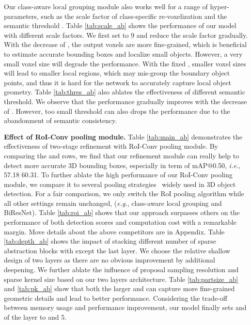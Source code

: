 \documentclass{article}
\begin{document}
Our class-aware local grouping module also works well for a range of hyper-parameters, such as the scale factor  of class-specific re-voxelization and the semantic threshold . Table \ref{tab:scale_ab} shows the performance of our model with different scale factors. We first set  to 9 and reduce the scale factor  gradually. With the decrease of , the output voxels are more fine-grained, which is beneficial to estimate accurate bounding boxes and localize small objects. However, a very small voxel size will degrade the performance. With the fixed , smaller voxel sizes will lead to smaller local regions, which may mis-group the boundary object points, and thus it is hard for the network to accurately capture local object geometry. Table \ref{tab:thres_ab} also ablates the effectiveness of different semantic threshold. We observe that the performance gradually improves with the decrease of . However, too small threshold can also drops the performance due to the abandonment of semantic consistency.

\textbf{Effect of RoI-Conv pooling module.} Table \ref{tab:main_ab} demonstrates the effectiveness of two-stage refinement with RoI-Conv pooling module. By comparing the  and  rows, we find that our refinement module can really help to detect more accurate 3D bounding boxes, especially in term of mAP@0.50, \textit{i.e.}, 57.18  60.31. To further ablate the high performance of our RoI-Conv pooling module, we compare it to several pooling strategies~\cite{shi2019pointrcnn,shi2020p2} widely used in 3D object detection. For a fair comparison, we only switch the RoI pooling algorithm while all other settings remain unchanged, (\textit{e.g.}, class-aware local grouping and BiResNet). Table \ref{tab:roi_ab} shows that our approach surpasses others on the performance of both detection scores and computation cost with a remarkable margin. Move details about the above competitors are in Appendix. Table \ref{tab:depth_ab} shows the impact of stacking different number of sparse abstraction blocks with  except the last layer. We choose the relative shallow design of two layers as there are no obvious improvement by additional deepening. We further ablate the influence of proposal sampling resolution and sparse kernel size  based on our two layers architecture. Table \ref{tab:partsize_ab} and \ref{tab:pk_ab} show that both the larger  and  can capture more fine-grained geometric details and lead to better performance. Considering the trade-off between memory usage and performance improvement, our model finally sets  and  of the  layer to  and 5. 
\end{document}
